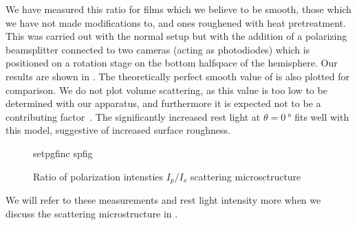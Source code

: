 We have measured this ratio for films which we believe to be smooth, those
which we have not made modifications to, and ones roughened with heat
pretreatment.  This was carried out with the normal setup but with the
addition of a polarizing beamsplitter connected to two cameras (acting as
photodiodes) which is positioned on a rotation stage on the bottom
halfspace of the hemisphere.  Our results are shown in .
The theoretically perfect smooth value of  is also
plotted for comparison.  We do not plot volume scattering, as this value is
too low to be determined with our apparatus, and furthermore it is expected
not to be a contributing factor~\cite{kretschmann1972decay}.  The
significantly increased rest light at $\theta=\SI{0}{\degree}$ fits well
with this model, suggestive of increased surface roughness.
\begin{figure}[ht]
 \centering
 {setpgfinc}
 {spfig}
 \caption{Ratio of polarization intensties $I_p/I_s$ scattering microsctructure}
 \label{fig:spratio}
\end{figure}

We will refer to these measurements and rest light intensity more when we
discuss the scattering microstructure in .
